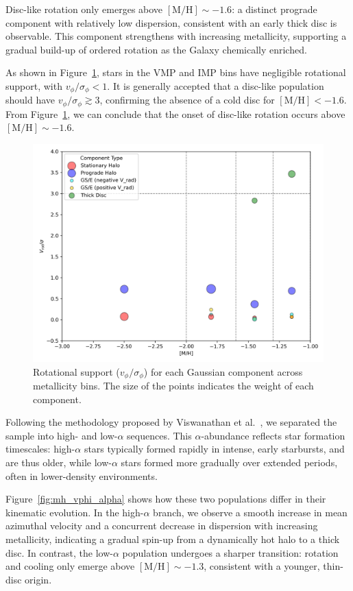\documentclass[a4paper,10pt]{article}
\begin{document}
\begin{multicols}{2}
Disc-like rotation only emerges above $\mathrm{[M/H]} \sim -1.6$: a distinct prograde component with 
relatively low dispersion, consistent with an early thick disc is observable. 
This component strengthens with increasing metallicity, supporting a gradual build-up of 
ordered rotation as the Galaxy chemically enriched.

As shown in Figure~\ref{fig:v_over_sigma}, stars in the VMP and IMP bins have negligible rotational support, 
with $v_\phi / \sigma_\phi < 1$. It is generally accepted that a disc-like population should have 
$v_\phi / \sigma_\phi \gtrsim 3$, confirming the absence of a cold disc for $\mathrm{[M/H]} < -1.6$.
From Figure~\ref{fig:v_over_sigma}, we can conclude that the onset of disc-like rotation occurs 
above $\mathrm{[M/H]} \sim -1.6$.

\begin{figure}[H]
  \centering
  \includegraphics[width=0.7\linewidth]{../figures/v_over_sigma_per_component.png}
  \caption{Rotational support ($v_\phi / \sigma_\phi$) for each Gaussian component across metallicity bins.
  The size of the points indicates the weight of each component.}
  \label{fig:v_over_sigma}
\end{figure}






Following the methodology proposed by Viswanathan et al.~\cite{Vis2024}, we separated the sample into 
high- and low-$\alpha$ sequences. This $\alpha$-abundance reflects star formation timescales: high-$\alpha$ 
stars typically formed rapidly in intense, early starbursts, and are thus older, while low-$\alpha$ stars 
formed more gradually over extended periods, often in lower-density environments.

Figure~\ref{fig:mh_vphi_alpha} shows how these two populations differ in their kinematic evolution. 
In the high-$\alpha$ branch, we observe a smooth increase in mean azimuthal velocity and a concurrent 
decrease in dispersion with increasing metallicity, indicating a gradual spin-up from a dynamically hot 
halo to a thick disc. In contrast, the low-$\alpha$ population undergoes a sharper transition: 
rotation and cooling only emerge above $\mathrm{[M/H]} \sim -1.3$, consistent with a younger, thin-disc origin.


\end{multicols}
\end{document}
